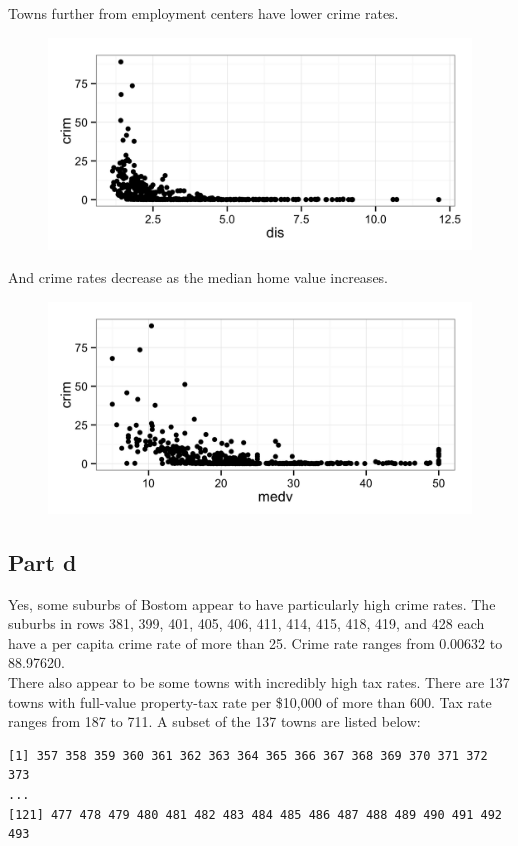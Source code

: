\documentclass[11pt]{article}
\begin{document}
Towns further from employment centers have lower crime rates.
\begin{figure}[H]
	\centering
	\includegraphics[width=5in]{10b_crim_vs_dis.png}
\end{figure}

And crime rates decrease as the median home value increases.
\begin{figure}[H]
	\centering
	\includegraphics[width=5in]{10b_crim_vs_medv.png}
\end{figure}


\subsection*{Part d}


Yes, some suburbs of Bostom appear to have particularly high crime rates. The suburbs in rows 381, 399, 401, 405, 406, 411, 414, 415, 418, 419, and 428 each have a per capita crime rate of more than 25. Crime rate ranges from 0.00632 to 88.97620.\\

There also appear to be some towns with incredibly high tax rates. There are 137 towns with full-value property-tax rate per \$10,000 of more than 600. Tax rate ranges from 187 to 711. A subset of the 137 towns are listed below:
\begin{verbatim}
[1] 357 358 359 360 361 362 363 364 365 366 367 368 369 370 371 372 373
...
[121] 477 478 479 480 481 482 483 484 485 486 487 488 489 490 491 492 493
\end{verbatim}
\end{document}
